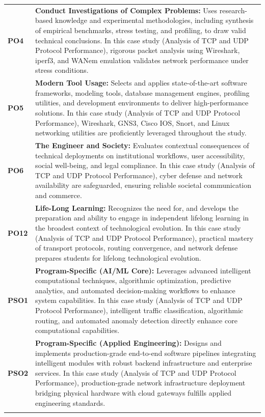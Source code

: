 {\begin{longtable}{@{}>{\centering\arraybackslash}p{1.8cm} p{13.2cm}@{}}
    \addlinespace
\textbf{PO4} & \textbf{Conduct Investigations of Complex Problems:} Uses research-based knowledge and experimental methodologies, including synthesis of empirical benchmarks, stress testing, and profiling, to draw valid technical conclusions. In this case study (Analysis of TCP and UDP Protocol Performance), rigorous packet analysis using Wireshark, iperf3, and WANem emulation validates network performance under stress conditions. \\
    \addlinespace
\textbf{PO5} & \textbf{Modern Tool Usage:} Selects and applies state-of-the-art software frameworks, modeling tools, database management engines, profiling utilities, and development environments to deliver high-performance solutions. In this case study (Analysis of TCP and UDP Protocol Performance), Wireshark, GNS3, Cisco IOS, Snort, and Linux networking utilities are proficiently leveraged throughout the study. \\
    \addlinespace
\textbf{PO6} & \textbf{The Engineer and Society:} Evaluates contextual consequences of technical deployments on institutional workflows, user accessibility, social well-being, and legal compliance. In this case study (Analysis of TCP and UDP Protocol Performance), cyber defense and network availability are safeguarded, ensuring reliable societal communication and commerce. \\
    \addlinespace
\textbf{PO12} & \textbf{Life-Long Learning:} Recognizes the need for, and develops the preparation and ability to engage in independent lifelong learning in the broadest context of technological evolution. In this case study (Analysis of TCP and UDP Protocol Performance), practical mastery of transport protocols, routing convergence, and network defense prepares students for lifelong technological evolution. \\
    \addlinespace
\textbf{PSO1} & \textbf{Program-Specific (AI/ML Core):} Leverages advanced intelligent computational techniques, algorithmic optimization, predictive analytics, and automated decision-making workflows to enhance system capabilities. In this case study (Analysis of TCP and UDP Protocol Performance), intelligent traffic classification, algorithmic routing, and automated anomaly detection directly enhance core computational capabilities. \\
    \addlinespace
\textbf{PSO2} & \textbf{Program-Specific (Applied Engineering):} Designs and implements production-grade end-to-end software pipelines integrating intelligent modules with robust backend infrastructure and enterprise services. In this case study (Analysis of TCP and UDP Protocol Performance), production-grade network infrastructure deployment bridging physical hardware with cloud gateways fulfills applied engineering standards. \\
    \addlinespace
    \bottomrule
\end{longtable}}